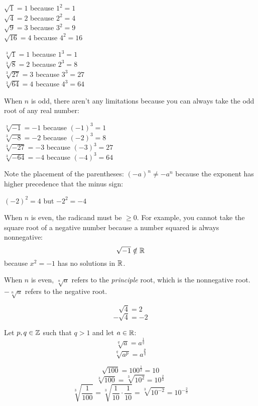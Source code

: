 \documentclass[letterpaper,12pt,fleqn]{article}
\begin{document}
\begin{example}
  \begin{minipage}[t]{3in}
    $\sqrt{1}=1$ because $1^2=1$ \\
    $\sqrt{4}=2$ because $2^2=4$ \\
    $\sqrt{9}=3$ because $3^2=9$ \\
    $\sqrt{16}=4$ because $4^2=16$
  \end{minipage}
  \begin{minipage}[t]{3in}
    $\sqrt[3]{1}=1$ because $1^3=1$ \\
    $\sqrt[3]{8}=2$ because $2^3=8$ \\
    $\sqrt[3]{27}=3$ because $3^3=27$ \\
    $\sqrt[3]{64}=4$ because $4^3=64$
  \end{minipage}
\end{example}

When $n$ is odd, there aren't any limitations because you can always take the
odd root of any real number:

$\sqrt[3]{-1}=-1$ because $(-1)^3=1$ \\
$\sqrt[3]{-8}=-2$ because $(-2)^3=8$ \\
$\sqrt[3]{-27}=-3$ because $(-3)^3=27$ \\
$\sqrt[3]{-64}=-4$ because $(-4)^3=64$

Note the placement of the parentheses: $(-a)^n\ne-a^n$ because the exponent has
higher precedence that the minus sign:

$(-2)^2=4$ but $-2^2=-4$

When $n$ is even, the radicand must be $\ge0$. For example, you cannot take
the square root of a negative number because a number squared is always
nonnegative:
\[\sqrt{-1}\notin\mathbb{R}\]
because $x^2=-1$ has no solutions in $\mathbb{R}$.

When $n$ is even, $\sqrt[n]{a}$ refers to the \emph{principle} root, which is
the nonnegative root. $-\sqrt[n]{a}$ refers to the negative root.

\begin{example}
  \[\sqrt{4}=2\]
  \[-\sqrt{4}=-2\]
\end{example}

\begin{definition}
  Let $p,q\in\mathbb{Z}$ such that $q>1$ and let $a\in\mathbb{R}$:
  \[\sqrt[q]{a}=a^{\frac{1}{q}}\]
  \[\sqrt[q]{a^p}=a^{\frac{p}{q}}\]
\end{definition}

\begin{example}
  \[\sqrt{100}=100^{\frac{1}{2}}=10\]
  \[\sqrt[3]{100}=\sqrt[3]{10^2}=10^{\frac{2}{3}}\]
  \[\sqrt[3]{\frac{1}{100}}=\sqrt[3]{\frac{1}{10}\cdot\frac{1}{10}}=
  \sqrt[3]{10^{-2}}=10^{-\frac{2}{3}}\]
\end{example}
\end{document}
